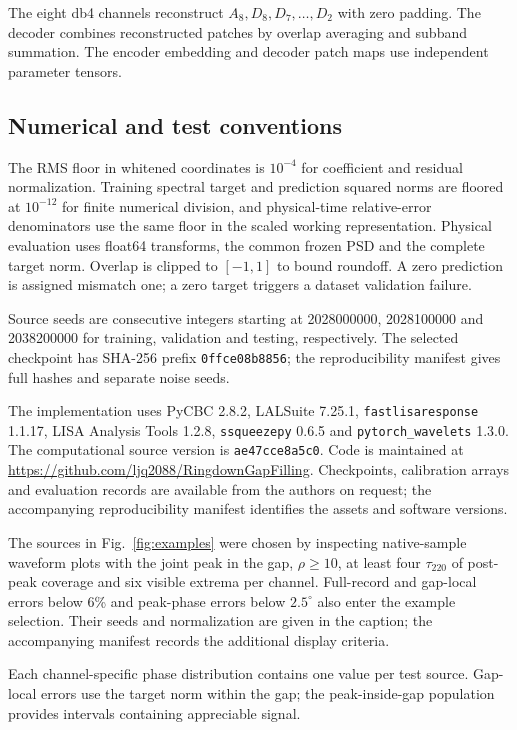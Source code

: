 \documentclass[10pt,prd,aps,a4paper,twocolumn,superscriptaddress,nofootinbib,floatfix]{revtex4-2}
\begin{document}
The eight db4 channels reconstruct $A_8,D_8,D_7,\ldots,D_2$ with zero padding. The decoder combines reconstructed patches by overlap averaging and subband summation. The encoder embedding and decoder patch maps use independent parameter tensors.

\subsection{Numerical and test conventions}
The RMS floor in whitened coordinates is $10^{-4}$ for coefficient and residual normalization. Training spectral target and prediction squared norms are floored at $10^{-12}$ for finite numerical division, and physical-time relative-error denominators use the same floor in the scaled working representation. Physical evaluation uses float64 transforms, the common frozen PSD and the complete target norm. Overlap is clipped to $[-1,1]$ to bound roundoff. A zero prediction is assigned mismatch one; a zero target triggers a dataset validation failure.

Source seeds are consecutive integers starting at 2028000000, 2028100000 and 2038200000 for training, validation and testing, respectively. The selected checkpoint has SHA-256 prefix \texttt{0ffce08b8856}; the reproducibility manifest gives full hashes and separate noise seeds.

The implementation uses PyCBC 2.8.2, LALSuite 7.25.1, \texttt{fastlisaresponse} 1.1.17, LISA Analysis Tools 1.2.8, \texttt{ssqueezepy} 0.6.5 and \texttt{pytorch\_wavelets} 1.3.0. The computational source version is \texttt{ae47cce8a5c0}. Code is maintained at \url{https://github.com/ljq2088/RingdownGapFilling}. Checkpoints, calibration arrays and evaluation records are available from the authors on request; the accompanying reproducibility manifest identifies the assets and software versions.

The sources in Fig.~\ref{fig:examples} were chosen by inspecting native-sample waveform plots with the joint peak in the gap, $\rho\ge10$, at least four $\tau_{220}$ of post-peak coverage and six visible extrema per channel. Full-record and gap-local errors below 6\% and peak-phase errors below $2.5^\circ$ also enter the example selection. Their seeds and normalization are given in the caption; the accompanying manifest records the additional display criteria.

Each channel-specific phase distribution contains one value per test source. Gap-local errors use the target norm within the gap; the peak-inside-gap population provides intervals containing appreciable signal.
\end{document}
